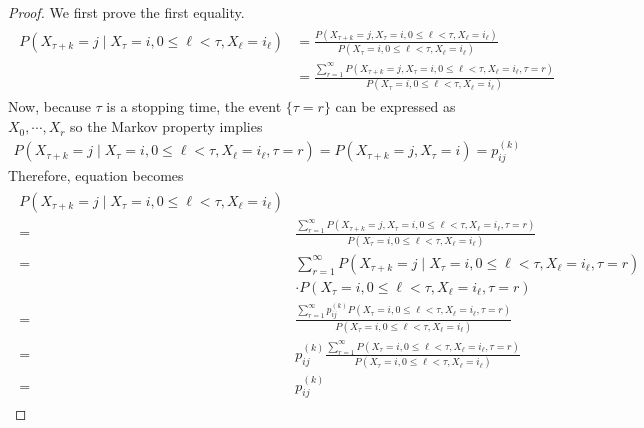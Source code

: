     \begin{proof}
        We first prove the first equality.
        \begin{gather*}
        \begin{aligned}
            P\left(X_{\tau+k}=j \mid X_{\tau}=i, 0 \leq \ell<\tau, X_{\ell}=i_{\ell}\right) &=\frac{P\left(X_{\tau+k}=j, X_{\tau}=i, 0 \leq \ell<\tau, X_{\ell}=i_{\ell}\right)}{P\left(X_{\tau}=i, 0 \leq \ell<\tau, X_{\ell}=i_{\ell}\right)} \\
            &=\frac{\sum_{r=1}^{\infty} P\left(X_{\tau+k}=j, X_{\tau}=i, 0 \leq \ell<\tau, X_{\ell}=i_{\ell}, \tau=r\right)}{P\left(X_{\tau}=i, 0 \leq \ell<\tau, X_{\ell}=i_{\ell}\right)}
        \end{aligned}
        \end{gather*}
        Now, because $\tau$ is a stopping time, the event $\{\tau=r\}$ can be expressed as $X_{0}, \cdots, X_{r}$ so the Markov property implies
        \begin{gather*}
            P\left(X_{\tau+k}=j \mid X_{\tau}=i, 0 \leq \ell<\tau, X_{\ell}=i_{\ell}, \tau=r\right)=P\left(X_{\tau+k}=j, X_{\tau}=i\right)=p_{i j}^{(k)}
        \end{gather*}
        Therefore, equation becomes
        \begin{gather*}
        \begin{aligned}
            P\left(X_{\tau+k}=j \mid X_{\tau}=i, 0 \leq \ell<\tau, X_{\ell}=i_{\ell}\right) & \\
            =& \frac{\sum_{r=1}^{\infty} P\left(X_{\tau+k}=j, X_{\tau}=i, 0 \leq \ell<\tau, X_{\ell}=i_{\ell}, \tau=r\right)}{P\left(X_{\tau}=i, 0 \leq \ell<\tau, X_{\ell}=i_{\ell}\right)} \\
            =& \sum_{r=1}^{\infty} P\left(X_{\tau+k}=j \mid X_{\tau}=i, 0 \leq \ell<\tau, X_{\ell}=i_{\ell}, \tau=r\right)\\
            & \cdot P\left(X_{\tau}=i, 0 \leq \ell<\tau, X_{\ell}=i_{\ell}, \tau=r\right) \\
            =& \frac{\sum_{r=1}^{\infty} p_{i j}^{(k)} P\left(X_{\tau}=i, 0 \leq \ell<\tau, X_{\ell}=i_{\ell}, \tau=r\right)}{P\left(X_{\tau}=i, 0 \leq \ell<\tau, X_{\ell}=i_{\ell}\right)} \\
            =& p_{i j}^{(k)} \frac{\sum_{r=1}^{\infty} P\left(X_{\tau}=i, 0 \leq \ell<\tau, X_{\ell}=i_{\ell}, \tau=r\right)}{P\left(X_{\tau}=i, 0 \leq \ell<\tau, X_{\ell}=i_{\ell}\right)} \\
            =& p_{i j}^{(k)}
        \end{aligned}

\end{gather*}
\end{proof}
